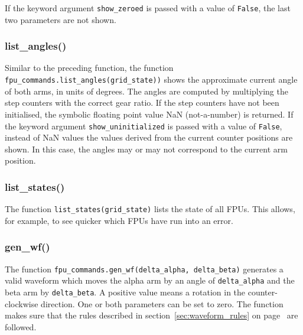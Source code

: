 \documentclass[11pt,a4paper]{report}
\begin{document}
If the keyword argument \texttt{show\_zeroed} is passed with a value of
\texttt{False}, the last two parameters are not shown.

\subsubsection{list\_angles()}
\label{sec:listangles}

Similar to the preceding function, the function
\texttt{fpu\_commands.list\_angles(grid\_state))} shows the
approximate current angle of both arms, in units of degrees. The
angles are computed by multiplying the step counters with the correct
gear ratio. If the step counters have not been initialised, the
symbolic floating point value NaN (not-a-number) is returned.  If the
keyword argument \texttt{show\_uninitialized} is passed with a value
of \texttt{False}, instead of NaN values the values derived from the
current counter positions are shown. In this case, the angles may or
may not correspond to the current arm position.

\subsubsection{list\_states()}
\label{sec:liststates}

The function \texttt{list\_states(grid\_state)} lists the state of all
FPUs. This allows, for example, to see quicker which FPUs have run into an error.


\subsubsection{gen\_wf()}
\label{sec:genwf}


The function \texttt{fpu\_commands.gen\_wf(delta\_alpha,
  delta\_beta)} generates a valid waveform which moves the alpha arm
by an angle of \texttt{delta\_alpha} and the beta arm by
\texttt{delta\_beta}. A positive value means a rotation in the
counter-clockwise direction.  One or both parameters can be set to
zero. The function makes sure that the rules described in
section~\ref{sec:waveform_rules} on page~\pageref{sec:waveform_rules}
are followed.
\end{document}
